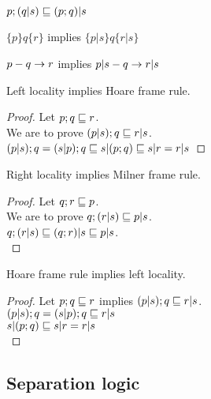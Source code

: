 \documentclass{article}
\begin{document}
\begin{law}
$p; (q | s) \sqsubseteq (p; q) | s$
\end{law}

\begin{rul}
$\{p\} q \{r\}$ implies $\{p | s\} q \{r | s\}$
\end{rul}

\begin{rul}
$p-q\rightarrow r$ implies $p | s-q\rightarrow r | s$
\end{rul}

\begin{theorem}
Left locality implies Hoare frame rule.
\end{theorem}

\begin{proof}
Let $p; q \sqsubseteq r$.\\
We are to prove $(p | s); q \sqsubseteq r | s$.\\
$(p | s); q = (s | p); q \sqsubseteq s | (p ; q) \sqsubseteq s | r = r | s$
\end{proof}

\begin{theorem}
Right locality implies Milner frame rule.
\end{theorem}

\begin{proof}
Let $q; r \sqsubseteq p$.\\
We are to prove $q; (r | s) \sqsubseteq p | s$.\\
$q; (r |s) \sqsubseteq (q; r) | s \sqsubseteq p | s$.\\
\end{proof}

\begin{theorem}
Hoare frame rule implies left locality.
\end{theorem}

\begin{proof}
Let $p; q \sqsubseteq r$ implies $(p | s); q \sqsubseteq r | s$.\\
$(p | s); q = (s | p); q \sqsubseteq r | s$\\
$s | (p; q) \sqsubseteq s | r = r | s$\\
\end{proof}

\subsection*{Separation logic}

\begin{axiom}
\end{axiom}
\end{document}
